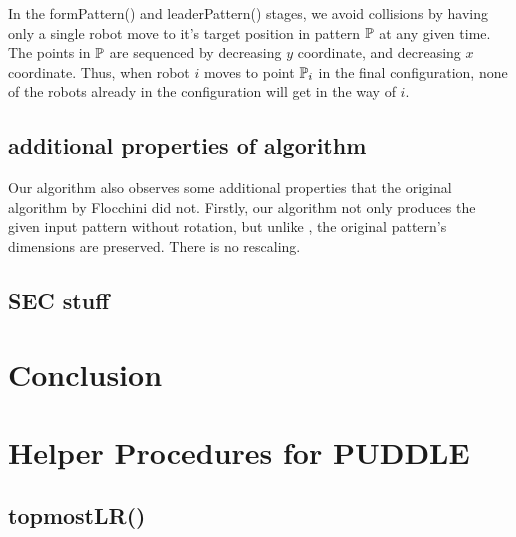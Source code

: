 \documentclass[preprint,10pt]{elsarticle}
\begin{document}
		In the formPattern() and leaderPattern() stages, we avoid collisions by having only a single robot move to
		it's target position in pattern $\mathbb{P}$ at any given time. The points in $\mathbb{P}$ are sequenced by 
		decreasing $y$ coordinate, and decreasing $x$ coordinate. Thus, when robot $i$ moves to point $\mathbb{P}_i$ in 
		the final configuration, none of the robots already in the configuration will get in the way of $i$. \\


		\subsection{additional properties of algorithm} 
		Our algorithm also observes some additional properties that the original algorithm by Flocchini did not.
		Firstly, our algorithm not only produces the given input pattern without rotation, but unlike \cite{flocchini12distrib},
		the original pattern's dimensions are preserved. There is no rescaling.


%

\subsection{SEC stuff } 

\section{Conclusion}
\label{conc}


\appendix
\section{Helper Procedures for PUDDLE}
\subsection{topmostLR()} 
\end{document}
